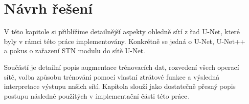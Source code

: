 \chapter{Návrh řešení}
\label{sec:Chapter4}
V této kapitole si přiblížíme detailnější aspekty ohledně sítí z řad U-Net, které byly v rámci této práce implementovány. Konkrétně se jedná o U-Net, U-Net++ a pokus o zařazení STN modulu do sítě U-Net.

Součástí je detailní popis augmentace trénovacích dat, rozvedení všech operací sítě, volba způsobu trénování pomocí vlastní ztrátové funkce a výsledná interpretace výstupu našich sítí. Kapitola slouží jako dostatečně přesný popis postupu následně použitých v implementační části této práce.
\endinput
